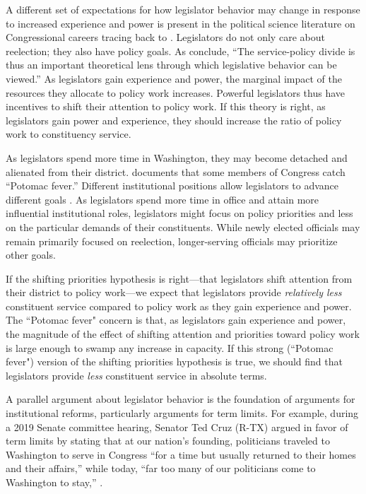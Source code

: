 \documentclass[12pt]{article}
\begin{document}
A different set of expectations for how legislator behavior may change in response to increased experience and power is present in the political science literature on Congressional careers tracing back to \citet{Fenno1973}.
Legislators do not only care about reelection; they also have policy goals. As \citet[p. 475]{ButlerKarpowitzPope2012} conclude, ``The service-policy divide is thus an important theoretical lens through which legislative behavior can be viewed.'' As legislators gain experience and power, the marginal impact of the resources they allocate to policy work increases. Powerful legislators thus have incentives to shift their attention to policy work. If this theory is right, as legislators gain power and experience, they should increase the ratio of policy work to constituency service.

As legislators spend more time in Washington, they may become detached and alienated from their district. \citet{Fenno1978} documents that some members of Congress catch ``Potomac fever.''  Different institutional positions allow legislators to advance different goals \citep{Fenno1973}.  As legislators spend more time in office and attain more influential institutional roles, legislators might focus on policy priorities and less on the particular demands of their constituents. While newly elected officials may remain primarily focused on reelection, longer-serving officials may prioritize other goals. 

If the shifting priorities hypothesis is right---that legislators shift attention from their district to policy work---we expect that legislators provide \textit{relatively less} constituent service compared to policy work as they gain experience and power. The ``Potomac fever" concern is that, as legislators gain experience and power, the magnitude of the effect of shifting attention and priorities toward policy work is large enough to swamp any increase in capacity. If this strong (``Potomac fever") version of the shifting priorities hypothesis is true, we should find that legislators provide \textit{less} constituent service in absolute terms. 

A parallel argument about legislator behavior is the foundation of arguments for institutional reforms, particularly arguments for term limits. %
For example, during a 2019 Senate committee hearing, 
Senator Ted Cruz (R-TX) argued in favor of term limits by stating that at our nation's founding, politicians traveled to Washington to serve in Congress ``for a time but usually returned to their homes and their affairs,'' while today, ``far too many of our politicians come to Washington to stay,'' \citep{termlimit2019}.  %
\end{document}
